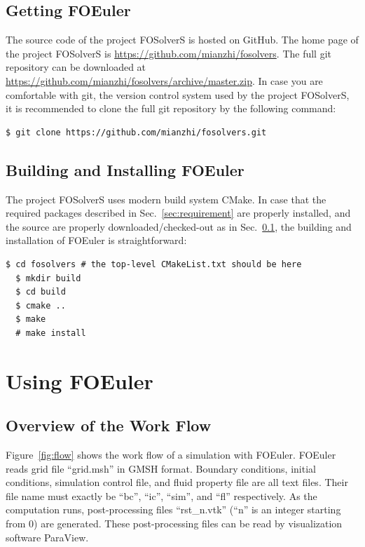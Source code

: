 \documentclass[]{article}
\begin{document}
\subsection{Getting FOEuler}
\label{sec:getting}

The source code of the project FOSolverS is hosted on GitHub.
The home page of the project FOSolverS is \url{https://github.com/mianzhi/fosolvers}.
The full git repository can be downloaded at \\
\url{https://github.com/mianzhi/fosolvers/archive/master.zip}.
In case you are comfortable with git, the version control system used by the project FOSolverS, it
is recommended to clone the full git repository by the following command:
\begin{lstlisting}[backgroundcolor=\color{lightgray}]
  $ git clone https://github.com/mianzhi/fosolvers.git
\end{lstlisting}

\subsection{Building and Installing FOEuler}

The project FOSolverS uses modern build system CMake.
In case that the required packages described in Sec.~\ref{sec:requirement} are properly installed,
and the source are properly downloaded/checked-out as in Sec.~\ref{sec:getting}, the building and
installation of FOEuler is straightforward:
\begin{lstlisting}[backgroundcolor=\color{lightgray}]
  $ cd fosolvers # the top-level CMakeList.txt should be here
  $ mkdir build
  $ cd build
  $ cmake ..
  $ make
  # make install
\end{lstlisting}

\section{Using FOEuler}

\subsection{Overview of the Work Flow}

Figure~\ref{fig:flow} shows the work flow of a simulation with FOEuler.
FOEuler reads grid file ``grid.msh'' in GMSH format.
Boundary conditions, initial conditions, simulation control file, and fluid property file are all
text files.
Their file name must exactly be ``bc'', ``ic'', ``sim'', and ``fl'' respectively.
As the computation runs, post-processing files ``rst\_n.vtk'' (``n'' is an integer starting from 0)
are generated.
These post-processing files can be read by visualization software ParaView.
\end{document}
